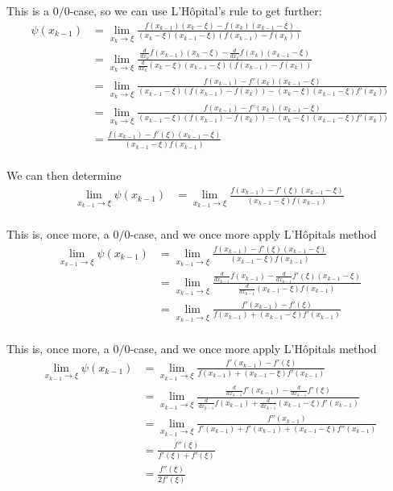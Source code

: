 This is a $0/0$-case, so we can use L'Hôpital's rule to get further:
\begin{align*}
    \psi(x_{k-1}) 
    &= \lim_{x_k \to \xi}
    \frac{
        f(x_{k-1})(x_k - \xi) - f(x_k)(x_{k-1} - \xi)}
    {(x_k - \xi)(x_{k-1} - \xi)(f(x_{k-1}) - f(x_k))} \\
    &= \lim_{x_k \to \xi}
    \frac{\frac{d}{d x_k}
        f(x_{k-1})(x_k - \xi) - \frac{d}{d x_k}f(x_k)(x_{k-1} - \xi)}
    {\frac{d}{d x_k}(x_k - \xi)(x_{k-1} - \xi)(f(x_{k-1}) - f(x_k))} \\
    &= \lim_{x_k \to \xi}
    \frac{
        f(x_{k-1}) - f'(x_k)(x_{k-1} - \xi)}
    {(x_{k-1} - \xi)(f(x_{k-1}) - f(x_k)) - (x_k - \xi)(x_{k-1} - \xi)f'(x_k))} \\
    &= \lim_{x_k \to \xi}
    \frac{
        f(x_{k-1}) - f'(x_k)(x_{k-1} - \xi)}
    {(x_{k-1} - \xi)(f(x_{k-1}) - f(x_k)) - (x_k - \xi)(x_{k-1} - \xi)f'(x_k))} \\
    &= \frac{
        f(x_{k-1}) - f'(\xi)(x_{k-1} - \xi)}
    {(x_{k-1} - \xi)f(x_{k-1})} \\
\end{align*}

We can then determine
\begin{align*}
    \lim_{x_{k-1} \to \xi} \psi(x_{k-1}) &= \lim_{x_{k-1} \to \xi} \frac{
        f(x_{k-1}) - f'(\xi)(x_{k-1} - \xi)}
    {(x_{k-1} - \xi)f(x_{k-1})} \\
\end{align*}

This is, once more, a $0/0$-case, and we once more apply L'Hôpitals method
\begin{align*}
    \lim_{x_{k-1} \to \xi} \psi(x_{k-1})
    &= \lim_{x_{k-1} \to \xi} \frac{
        f(x_{k-1}) - f'(\xi)(x_{k-1} - \xi)}
    {(x_{k-1} - \xi)f(x_{k-1})} \\
    &= \lim_{x_{k-1} \to \xi}
    \frac{\frac{d}{d x_{k-1}}
        f(x_{k-1}) - \frac{d}{d x_{k-1}}f'(\xi)(x_{k-1} - \xi)}
    {\frac{d}{d x_{k-1}}(x_{k-1} - \xi)f(x_{k-1})} \\
    &= \lim_{x_{k-1} \to \xi}
    \frac{
        f'(x_{k-1}) - f'(\xi)}
    {f(x_{k-1}) + (x_{k-1} - \xi)f'(x_{k-1})} \\
\end{align*}

This is, once more, a $0/0$-case, and we once more apply L'Hôpitals method
\begin{align*}
    \lim_{x_{k-1} \to \xi} \psi(x_{k-1})
    &= \lim_{x_{k-1} \to \xi}
    \frac{
        f'(x_{k-1}) - f'(\xi)}
    {f(x_{k-1}) + (x_{k-1} - \xi)f'(x_{k-1})} \\
    &= \lim_{x_{k-1} \to \xi}
    \frac{\frac{d}{d x_{k-1}}
        f'(x_{k-1}) - \frac{d}{d x_{k-1}}f'(\xi)}
    {\frac{d}{d x_{k-1}}f(x_{k-1}) + \frac{d}{d x_{k-1}}(x_{k-1} - \xi)f'(x_{k-1})} \\
    &= \lim_{x_{k-1} \to \xi}
    \frac{
        f''(x_{k-1})}
    {f'(x_{k-1}) + f'(x_{k-1}) + (x_{k-1} - \xi)f''(x_{k-1})} \\
    &= \frac{
        f''(\xi)}
    {f'(\xi) + f'(\xi)} \\
    &= \frac{
        f''(\xi)}
    {2f'(\xi)} \\
\end{align*}

